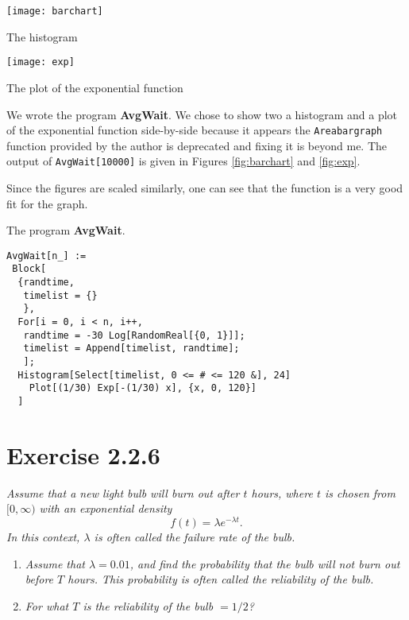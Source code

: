 \documentclass{tufte-handout}
\newenvironment{listingenv} {
  \begin{mylisting}
} {
  \end{mylisting}
}
\begin{document}
\bigskip

\begin{marginfigure}
  \centering
  \texttt{[image: barchart]}
  \caption{The histogram}
  \label{fig:barchart}
\end{marginfigure}

\begin{marginfigure}[4cm]
  \texttt{[image: exp]}
  \caption{The plot of the exponential function}
  \label{fig:exp}
\end{marginfigure}

We wrote the program \textbf{AvgWait}.  We chose to show two a
histogram and a plot of the exponential function side-by-side because
it appears the \lstinline$Areabargraph$ function provided by the
author is deprecated and fixing it is beyond me. The output of
\lstinline$AvgWait[10000]$ is given in Figures \ref{fig:barchart} and
\ref{fig:exp}.

Since the figures are scaled similarly, one can see that the function
is a very good fit for the graph.

\begin{listingenv}
\caption{The program \mbox{\textbf{AvgWait}}.}
\begin{lstlisting}
AvgWait[n_] :=
 Block[
  {randtime,
   timelist = {}
   },
  For[i = 0, i < n, i++,
   randtime = -30 Log[RandomReal[{0, 1}]];
   timelist = Append[timelist, randtime];
   ];
  Histogram[Select[timelist, 0 <= # <= 120 &], 24]
    Plot[(1/30) Exp[-(1/30) x], {x, 0, 120}]
  ]
\end{lstlisting}
\end{listingenv}


\section{Exercise 2.2.6}

\emph{Assume that a new light bulb will burn out after $t$ hours,
  where $t$ is chosen from $[0,\infty)$ with an exponential density
  \[ f(t) = \lambda e^{-\lambda t}.\]
  In this context, $\lambda$ is often called the \emph{failure rate}
  of the bulb.}
\begin{enumerate}[label=\emph{(\alph*)}]
\item \emph{Assume that $\lambda = 0.01$, and find the probability
    that the bulb will \emph{not} burn out before $T$ hours. This
    probability is often called the \emph{reliability} of the bulb.}
\item \emph{For what $T$ is the reliability of the bulb
    $= 1/2$?}
\end{enumerate}
\end{document}

